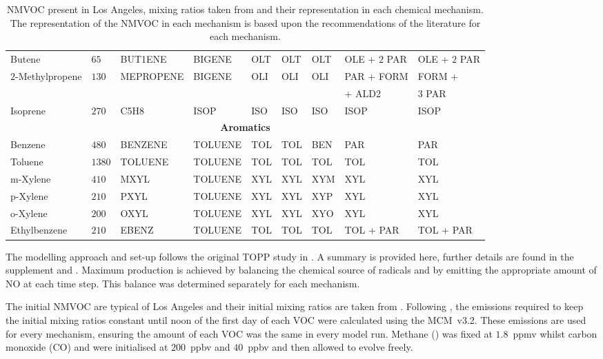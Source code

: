 \begin{sidewaystable}
\begin{tabular}{lllllllll}
        Butene & $65$ & BUT1ENE & BIGENE & OLT & OLT & OLT & OLE + $2$ PAR & OLE + $2$ PAR \\ 
        \multirow{2}{*}{$2$-Methylpropene} & \multirow{2}{*}{$130$} & \multirow{2}{*}{MEPROPENE} & \multirow{2}{*}{BIGENE} & \multirow{2}{*}{OLI} & \multirow{2}{*}{OLI} & \multirow{2}{*}{OLI} & PAR + FORM & FORM + \\ & & & & & & & \hspace{3mm}+ ALD2 & \hspace{3mm}$3$ PAR \\
        Isoprene & $270$ & C5H8 & ISOP & ISO & ISO & ISO & ISOP & ISOP \\ \hline
        \multicolumn{9}{c}{\textbf{Aromatics}} \\ \hline 
        Benzene & $480$ & BENZENE & TOLUENE & TOL & TOL & BEN & PAR & PAR \\
        Toluene & $1380$ & TOLUENE & TOLUENE & TOL & TOL & TOL & TOL & TOL \\
        m-Xylene & $410$ & MXYL & TOLUENE & XYL & XYL & XYM & XYL & XYL \\
        p-Xylene & $210$ & PXYL & TOLUENE & XYL & XYL & XYP & XYL & XYL \\
        o-Xylene & $200$ & OXYL & TOLUENE & XYL & XYL & XYO & XYL & XYL \\
        Ethylbenzene & $210$ & EBENZ & TOLUENE & TOL & TOL & TOL & TOL + PAR & TOL + PAR \\ \hline \hline
    \end{tabular}
    \vspace{1mm}
    \caption{NMVOC present in Los Angeles, mixing ratios taken from \citet{Baker:2008} and their representation in each chemical mechanism. The representation of the NMVOC in each mechanism is based upon the recommendations of the literature for each mechanism.}
    \vspace{-4mm}
    \label{t:initial_conditions}
\end{sidewaystable}

The modelling approach and set-up follows the original TOPP study in \citet{Butler:2011}.
A summary is provided here, further details are found in the supplement and \citet{Butler:2011}. 
Maximum  production is achieved by balancing the chemical source of radicals and  by emitting the appropriate amount of NO at each time step.
This balance was determined separately for each mechanism.

The initial NMVOC are typical of Los Angeles and their initial mixing ratios are taken from \citet{Baker:2008}. 
Following \citet{Butler:2011}, the emissions required to keep the initial mixing ratios constant until noon of the first day of each VOC were calculated using the \mbox{MCM v3.2.}
These emissions are used for every mechanism, ensuring the amount of each VOC was the same in every model run.
Methane () was fixed at \mbox{$1.8$ ppmv} whilst carbon monoxide (CO) and  were initialised at \mbox{$200$ ppbv} and \mbox{$40$ ppbv} and then allowed to evolve freely.

